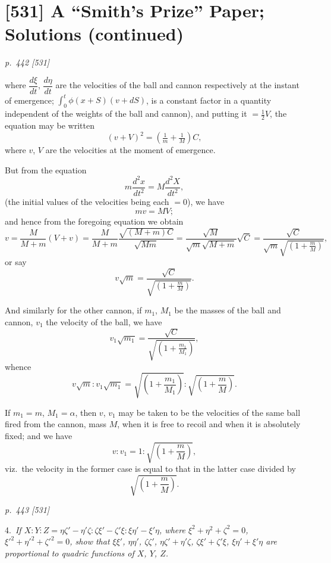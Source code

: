\documentclass[11pt,a4paper]{article}
\theoremstyle{plain}
\theoremstyle{definition}
\begin{document}
\section*{[531] A ``Smith's Prize'' Paper; Solutions \textnormal{(continued)}}

\bigskip
\textit{p.~442 [531]}
\smallskip

\noindent
where $\dfrac{d\xi}{dt}$, $\dfrac{d\eta}{dt}$ are the velocities of the ball and cannon respectively at the instant of
emergence; $\int_0^t \phi(x+S)(v+dS)$, is a constant factor in a quantity independent of the weights of the ball and cannon), and putting it $=\tfrac{1}{2}V$, the equation may be written
\[
(v+V)^2 = \left(\tfrac{1}{m}+\tfrac{1}{M}\right)C,
\]
where $v$, $V$ are the velocities at the moment of emergence.

But from the equation
\[
m\frac{d^2x}{dt^2} = M\frac{d^2X}{dt^2},
\]
(the initial values of the velocities being each $=0$), we have
\[
mv = MV;
\]
and hence from the foregoing equation we obtain
\[
v = \frac{M}{M+m}(V+v)
  = \frac{M}{M+m}\frac{\sqrt{(M+m)C}}{\sqrt{Mm}}
  = \frac{\sqrt{M}}{\sqrt{m}\sqrt{M+m}}\sqrt{C}
  = \frac{\sqrt{C}}{\sqrt{m}\sqrt{\left(1+\frac{m}{M}\right)}},
\]
or say
\[
v\sqrt{m} = \frac{\sqrt{C}}{\sqrt{\left(1+\frac{m}{M}\right)}}.
\]

And similarly for the other cannon, if $m_1$, $M_1$ be the masses of the ball and cannon,
$v_1$ the velocity of the ball, we have
\[
v_1 \sqrt{m_1} = \frac{\sqrt{C}}{\sqrt{\left(1+\frac{m_1}{M_1}\right)}},
\]
whence
\[
v\sqrt{m} : v_1 \sqrt{m_1} = \sqrt{\left(1+\frac{m_1}{M_1}\right)} : \sqrt{\left(1+\frac{m}{M}\right)}.
\]

If $m_1 = m$, $M_1 = \alpha$, then $v$, $v_1$ may be taken to be the velocities of the same ball fired
from the cannon, mass $M$, when it is free to recoil and when it is absolutely fixed;
and we have
\[
v : v_1 = 1 : \sqrt{\left(1+\frac{m}{M}\right)},
\]
viz.\ the velocity in the former case is equal to that in the latter case divided by
\[
\sqrt{\left(1+\frac{m}{M}\right)}.
\]

\clearpage

\bigskip
\textit{p.~443 [531]}
\smallskip

4.\ \textit{If $X : Y : Z = \eta\zeta' - \eta'\zeta : \zeta\xi' - \zeta'\xi : \xi\eta' - \xi'\eta$, where $\xi^2+\eta^2+\zeta^2=0$, $\xi'^2+\eta'^2+\zeta'^2=0$, show that $\xi\xi'$, $\eta\eta'$, $\zeta\zeta'$, $\eta\zeta' + \eta'\zeta$, $\zeta\xi' + \zeta'\xi$, $\xi\eta' + \xi'\eta$ are proportional to quadric functions of $X$, $Y$, $Z$.}
\end{document}
